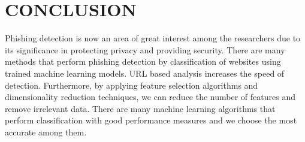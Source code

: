 \chapter{CONCLUSION}
\thispagestyle{empty}
\par Phishing detection is now an area of great interest among the researchers due to its significance in protecting privacy and providing security. There are many methods that perform phishing detection by classification of websites using trained machine learning models. URL based analysis increases the speed of detection. Furthermore, by applying feature selection algorithms and dimensionality reduction techniques, we can reduce the number of features and remove irrelevant data. There are many machine learning algorithms that perform classification with good performance measures and we choose the most accurate among them. 
